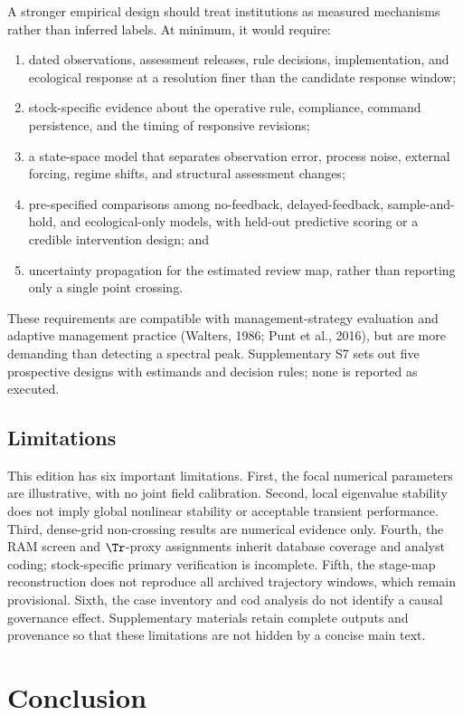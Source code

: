 A stronger empirical design should treat institutions as measured mechanisms rather than inferred labels. At minimum, it would require:
\begin{enumerate}
\item dated observations, assessment releases, rule decisions, implementation, and ecological response at a resolution finer than the candidate response window;
\item stock-specific evidence about the operative rule, compliance, command persistence, and the timing of responsive revisions;
\item a state-space model that separates observation error, process noise, external forcing, regime shifts, and structural assessment changes;
\item pre-specified comparisons among no-feedback, delayed-feedback, sample-and-hold, and ecological-only models, with held-out predictive scoring or a credible intervention design; and
\item uncertainty propagation for the estimated review map, rather than reporting only a single point crossing.
\end{enumerate}
These requirements are compatible with management-strategy evaluation and adaptive management practice (Walters, 1986; Punt et al., 2016), but are more demanding than detecting a spectral peak. Supplementary S7 sets out five prospective designs with estimands and decision rules; none is reported as executed.

\subsection{Limitations}

This edition has six important limitations. First, the focal numerical parameters are illustrative, with no joint field calibration. Second, local eigenvalue stability does not imply global nonlinear stability or acceptable transient performance. Third, dense-grid non-crossing results are numerical evidence only. Fourth, the RAM screen and \(\Tr\)-proxy assignments inherit database coverage and analyst coding; stock-specific primary verification is incomplete. Fifth, the stage-map reconstruction does not reproduce all archived trajectory windows, which remain provisional. Sixth, the case inventory and cod analysis do not identify a causal governance effect. Supplementary materials retain complete outputs and provenance so that these limitations are not hidden by a concise main text.

\section{Conclusion}\label{sec:conclusion}


